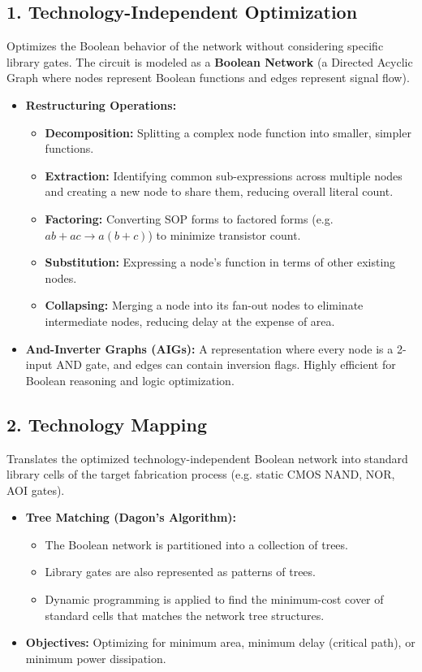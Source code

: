 \documentclass[12pt,a4paper]{article}
\begin{document}
\subsection{1. Technology-Independent Optimization}
Optimizes the Boolean behavior of the network without considering specific library gates. The circuit is modeled as a \textbf{Boolean Network} (a Directed Acyclic Graph where nodes represent Boolean functions and edges represent signal flow).
\begin{itemize}[leftmargin=*, itemsep=3pt]
  \item \textbf{Restructuring Operations:}
        \begin{itemize}[leftmargin=*, label=$\bullet$, itemsep=1.5pt]
          \item \textbf{Decomposition:} Splitting a complex node function into smaller, simpler functions.
          \item \textbf{Extraction:} Identifying common sub-expressions across multiple nodes and creating a new node to share them, reducing overall literal count.
          \item \textbf{Factoring:} Converting SOP forms to factored forms (e.g. $ab + ac \rightarrow a(b+c)$) to minimize transistor count.
          \item \textbf{Substitution:} Expressing a node's function in terms of other existing nodes.
          \item \textbf{Collapsing:} Merging a node into its fan-out nodes to eliminate intermediate nodes, reducing delay at the expense of area.
        \end{itemize}
  \item \textbf{And-Inverter Graphs (AIGs):} A representation where every node is a 2-input AND gate, and edges can contain inversion flags. Highly efficient for Boolean reasoning and logic optimization.
\end{itemize}

\subsection{2. Technology Mapping}
Translates the optimized technology-independent Boolean network into standard library cells of the target fabrication process (e.g. static CMOS NAND, NOR, AOI gates).
\begin{itemize}[leftmargin=*, itemsep=3pt]
  \item \textbf{Tree Matching (Dagon's Algorithm):}
        \begin{itemize}[leftmargin=*, label=$\bullet$, itemsep=1.5pt]
          \item The Boolean network is partitioned into a collection of trees.
          \item Library gates are also represented as patterns of trees.
          \item Dynamic programming is applied to find the minimum-cost cover of standard cells that matches the network tree structures.
        \end{itemize}
  \item \textbf{Objectives:} Optimizing for minimum area, minimum delay (critical path), or minimum power dissipation.
\end{itemize}
\end{document}
